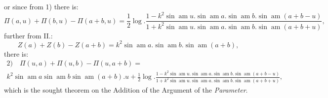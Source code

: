 \documentclass{article}
\begin{document}
or since from 1) there is:
\[
\Pi(a,u)+\Pi(b,u)-\Pi(a+b,u)=\frac{1}{2}\log.\frac{1-k^{2}\sin\operatorname{am}u.\sin\operatorname{am}a.\sin\operatorname{am}b.\sin\operatorname{am}(a+b-u)}{1+k^{2}\sin\operatorname{am}u.\sin\operatorname{am}a.\sin\operatorname{am}b.\sin\operatorname{am}(a+b+u)},
\]
further from II.:
\[
Z(a)+Z(b)-Z(a+b)=k^{2}\sin\operatorname{am}a.\sin\operatorname{am}b.\sin\operatorname{am}(a+b),
\]
there is:
\[
\begin{gathered}
\text{2)}\quad \Pi(u,a)+\Pi(u,b)-\Pi(u,a+b)=\\[1.5ex]
k^{2}\sin\operatorname{am}a\sin\operatorname{am}b\sin\operatorname{am}(a+b).u+\frac{1}{2}\log.\frac{1-k^{2}\sin\operatorname{am}u.\sin\operatorname{am}a.\sin\operatorname{am}b.\sin\operatorname{am}(a+b-u)}{1+k^{2}\sin\operatorname{am}u.\sin\operatorname{am}a.\sin\operatorname{am}b.\sin\operatorname{am}(a+b+u)},
\end{gathered}
\]
which is the sought theorem on the Addition of the Argument of the \emph{Parameter}.
\end{document}
